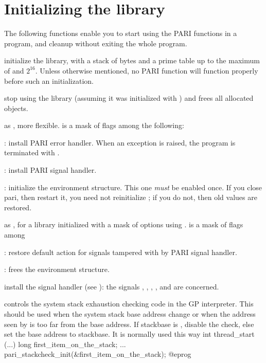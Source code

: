 \section{Initializing the library}

The following functions enable you to start using the PARI functions
in a program, and cleanup without exiting the whole program.


 initialize the
library, with a stack of  bytes and a prime table
up to the maximum of  and $2^{16}$. Unless otherwise
mentioned, no PARI function will function properly before such an
initialization.

 stop using the library (assuming it was
initialized with ) and frees all allocated objects.

\label{se:pari_init_tech}

 as
, more flexible.  is a mask of flags
among the following:

  : install PARI error handler. When an exception is
raised, the program is terminated with .

  : install PARI signal handler.

  : initialize the  environment structure.
This one \emph{must} be enabled once. If you close pari, then restart it,
you need not reinitialize ; if you do not, then old values are
restored.

 as ,
for a library initialized with a mask of options using
.  is a mask of flags among

  : restore  default action for signals
tampered with by PARI signal handler.

  : frees the  environment structure.

 install the signal handler 
(see ): the signals , , ,
,  and  are concerned.

 controls the system stack
exhaustion checking code in the GP interpreter. This should be used when the
system stack base address change or when the address seen by 
is too far from the base address. If stackbase is , disable the
check, else set the base address to stackbase. It is normally used this way
\bprog
int thread_start (...)
{
  long first_item_on_the_stack;
  ...
  pari_stackcheck_init(&first_item_on_the_stack);
}
@eprog

